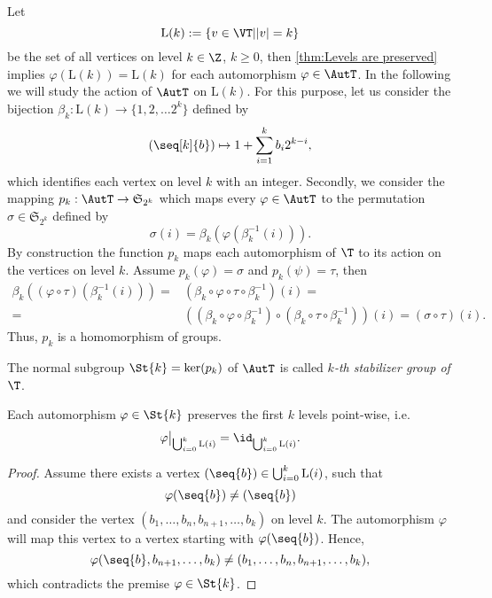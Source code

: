 Let
\begin{equation*}
\mathrm{L}(k):=\left\lbrace v\in\VT\middle\vert \lvert v\rvert=k\right\rbrace
\end{equation*}
be the set of all vertices on level $k\in\Z$, $k\geq 0$,  then \cref{thm:Levels are preserved} implies $\varphi(\mathrm{L}(k))=\mathrm{L}(k)$ for each automorphism $\varphi\in\AutT$. In the following we will study the action of $\AutT$ on $\mathrm{L}(k)$. For this purpose, let us consider the bijection $\beta_k\colon\mathrm{L}(k)\to\lbrace 1,2,\ldots 2^k\rbrace$ defined by 
\begin{equation*}
(\seq[k]{b})\mapsto 1+\sum_{i=1}^{k} b_i2^{k-i},
\end{equation*}
which identifies each vertex on level $k$ with an integer. Secondly, we consider the mapping $p_k:\AutT\to\mathfrak{S}_{2^k}$ which maps every $\varphi\in\AutT$ to the permutation $\sigma\in\mathfrak{S}_{2^k}$ defined by
\begin{equation*}
\sigma(i)=\beta_k(\varphi(\beta_k^{-1}(i))).
\end{equation*}
By construction the function $p_k$ maps each automorphism of $\T$ to its action on the vertices on level $k$. Assume $p_k(\varphi)=\sigma$ and $p_k(\psi)=\tau$, then
\begin{align*}
\beta_k((\varphi\circ\tau)(\beta_k^{-1}(i)))=&(\beta_k\circ\varphi\circ\tau\circ \beta_k^{-1})(i)=\\
=&((\beta_k\circ\varphi\circ \beta_k^{-1})\circ(\beta_k\circ\tau\circ \beta_k^{-1}))(i)=(\sigma\circ\tau)(i).
\end{align*}
Thus, $p_k$ is a homomorphism of groups.

\begin{defin}\label{def:Stabilizer Group}
The normal subgroup $\St{k}=\ker(p_k)$ of $\AutT$ is called \textit{$k$-th stabilizer group of $\T$}.
\end{defin}

\begin{pro}
Each automorphism $\varphi\in\St{k}$ preserves the first $k$ levels point-wise, i.e.
\begin{equation*}
\varphi\big\vert_{\bigcup_{i=0}^k\mathrm{L}(i)}=\id_{\bigcup_{i=0}^k\mathrm{L}(i)}.
\end{equation*}
\end{pro}
\begin{proof}
Assume there exists a vertex $(\seq{b})\in\bigcup_{i=0}^k\mathrm{L}(i)$, such that 
\begin{equation*}
\varphi(\seq{b})\neq (\seq{b})
\end{equation*}
and consider the vertex $(b_1,\ldots,b_n,b_{n+1},\ldots,b_k)$ on level $k$. The automorphism $\varphi$ will map this vertex to a vertex starting with $\varphi(\seq{b})$. Hence, 
\begin{equation*}
\varphi(\seq{b},b_{n+1},\ldots,b_k)\neq(b_1,\ldots,b_n,b_{n+1},\ldots,b_k),
\end{equation*}
which contradicts the premise $\varphi\in\St{k}$. 
\end{proof}